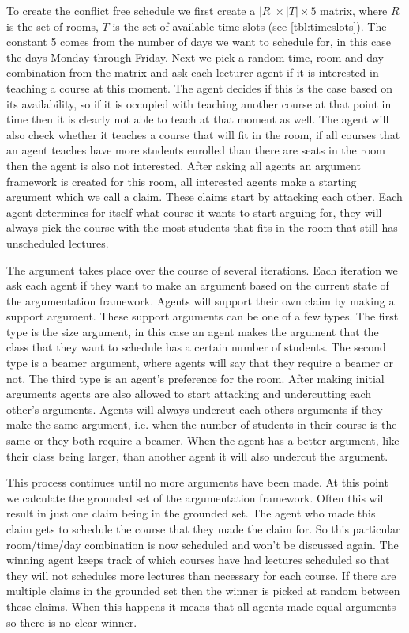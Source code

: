 To create the conflict free schedule we first create a $|R| \times |T| \times
5$ matrix, where $R$ is the set of rooms, $T$ is the set of available time
slots (see \autoref{tbl:timeslots}). The constant 5 comes from the number of
days we want to schedule for, in this case the days Monday through Friday. Next
we pick a random time, room and day combination from the matrix and ask each
lecturer agent if it is interested in teaching a course at this moment. The
agent decides if this is the case based on its availability, so if it is
occupied with teaching another course at that point in time then it is clearly
not able to teach at that moment as well. The agent will also check whether it
teaches a course that will fit in the room, if all courses that an agent teaches
have more students enrolled than there are seats in the room then the agent is
also not interested. After asking all agents an argument framework is created
for this room, all interested agents make a starting argument which we call a
claim. These claims start by attacking each other. Each agent determines for
itself what course it wants to start arguing for, they will always pick the
course with the most students that fits in the room that still has unscheduled
lectures.

The argument takes place over the course of several iterations. Each iteration
we ask each agent if they want to make an argument based on the current state of
the argumentation framework. Agents will support their own claim by making a
support argument. These support arguments can be one of a few types. The first
type is the size argument, in this case an agent makes the argument that the
class that they want to schedule has a certain number of students. The second
type is a beamer argument, where agents will say that they require a beamer or
not. The third type is an agent's preference for the room. After making initial
arguments agents are also allowed to start attacking and undercutting each
other's arguments. Agents will always undercut each others arguments if they
make the same argument, i.e. when the number of students in their course is the
same or they both require a beamer. When the agent has a better argument, like
their class being larger, than another agent it will also undercut the argument.

This process continues until no more arguments have been made. At this point we
calculate the grounded set of the argumentation framework. Often this will
result in just one claim being in the grounded set. The agent who made this
claim gets to schedule the course that they made the claim for. So this
particular room/time/day combination is now scheduled and won't be discussed
again. The winning agent keeps track of which courses have had lectures
scheduled so that they will not schedules more lectures than necessary for each
course. If there are multiple claims in the grounded set then the winner is
picked at random between these claims. When this happens it means that all
agents made equal arguments so there is no clear winner.


